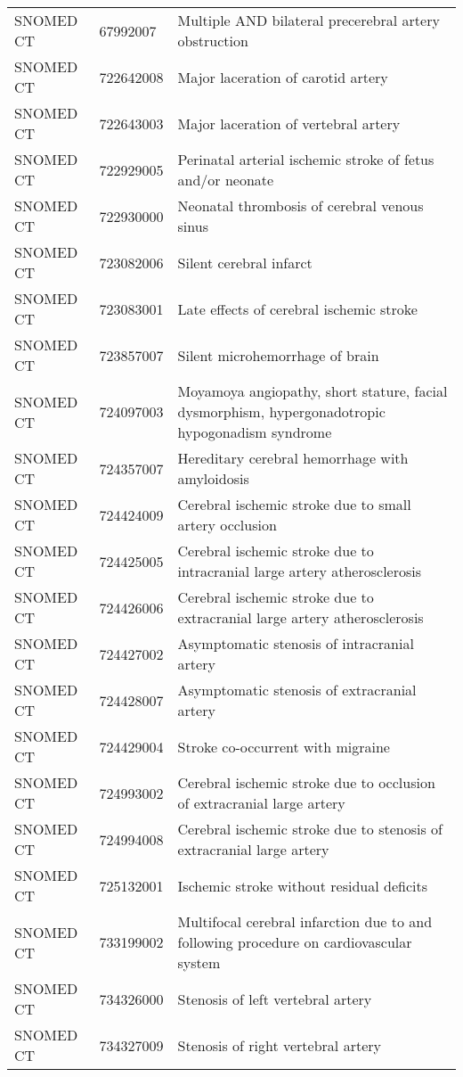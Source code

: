 \begin{longtable}{p{}p{}p{}}
  SNOMED CT & 67992007 & Multiple AND bilateral precerebral artery obstruction \\ 
  SNOMED CT & 722642008 & Major laceration of carotid artery \\ 
  SNOMED CT & 722643003 & Major laceration of vertebral artery \\ 
  SNOMED CT & 722929005 & Perinatal arterial ischemic stroke of fetus and/or neonate \\ 
  SNOMED CT & 722930000 & Neonatal thrombosis of cerebral venous sinus \\ 
  SNOMED CT & 723082006 & Silent cerebral infarct \\ 
  SNOMED CT & 723083001 & Late effects of cerebral ischemic stroke \\ 
  SNOMED CT & 723857007 & Silent microhemorrhage of brain \\ 
  SNOMED CT & 724097003 & Moyamoya angiopathy, short stature, facial dysmorphism, hypergonadotropic hypogonadism syndrome \\ 
  SNOMED CT & 724357007 & Hereditary cerebral hemorrhage with amyloidosis \\ 
  SNOMED CT & 724424009 & Cerebral ischemic stroke due to small artery occlusion \\ 
  SNOMED CT & 724425005 & Cerebral ischemic stroke due to intracranial large artery atherosclerosis \\ 
  SNOMED CT & 724426006 & Cerebral ischemic stroke due to extracranial large artery atherosclerosis \\ 
  SNOMED CT & 724427002 & Asymptomatic stenosis of intracranial artery \\ 
  SNOMED CT & 724428007 & Asymptomatic stenosis of extracranial artery \\ 
  SNOMED CT & 724429004 & Stroke co-occurrent with migraine \\ 
  SNOMED CT & 724993002 & Cerebral ischemic stroke due to occlusion of extracranial large artery \\ 
  SNOMED CT & 724994008 & Cerebral ischemic stroke due to stenosis of extracranial large artery \\ 
  SNOMED CT & 725132001 & Ischemic stroke without residual deficits \\ 
  SNOMED CT & 733199002 & Multifocal cerebral infarction due to and following procedure on cardiovascular system \\ 
  SNOMED CT & 734326000 & Stenosis of left vertebral artery \\ 
  SNOMED CT & 734327009 & Stenosis of right vertebral artery \\ 

\end{longtable}
